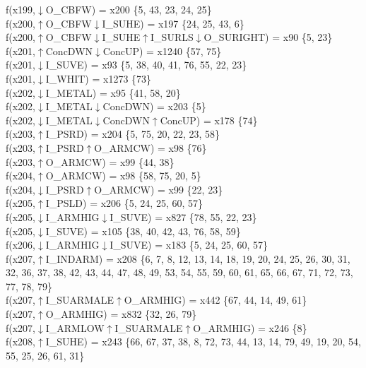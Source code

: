 f(x199,$\downarrow$O\_CBFW) = x200 \{5, 43, 23, 24, 25\} \\  
f(x200,$\uparrow$O\_CBFW$\downarrow$I\_SUHE) = x197 \{24, 25, 43, 6\} \\  
f(x200,$\uparrow$O\_CBFW$\downarrow$I\_SUHE$\uparrow$I\_SURLS$\downarrow$O\_SURIGHT) = x90 \{5, 23\} \\  
f(x201,$\uparrow$ConcDWN$\downarrow$ConcUP) = x1240 \{57, 75\} \\  
f(x201,$\downarrow$I\_SUVE) = x93 \{5, 38, 40, 41, 76, 55, 22, 23\} \\  
f(x201,$\downarrow$I\_WHIT) = x1273 \{73\} \\  
f(x202,$\downarrow$I\_METAL) = x95 \{41, 58, 20\} \\  
f(x202,$\downarrow$I\_METAL$\downarrow$ConcDWN) = x203 \{5\} \\  
f(x202,$\downarrow$I\_METAL$\downarrow$ConcDWN$\uparrow$ConcUP) = x178 \{74\} \\  
f(x203,$\uparrow$I\_PSRD) = x204 \{5, 75, 20, 22, 23, 58\} \\  
f(x203,$\uparrow$I\_PSRD$\uparrow$O\_ARMCW) = x98 \{76\} \\  
f(x203,$\uparrow$O\_ARMCW) = x99 \{44, 38\} \\  
f(x204,$\uparrow$O\_ARMCW) = x98 \{58, 75, 20, 5\} \\  
f(x204,$\downarrow$I\_PSRD$\uparrow$O\_ARMCW) = x99 \{22, 23\} \\  
f(x205,$\uparrow$I\_PSLD) = x206 \{5, 24, 25, 60, 57\} \\  
f(x205,$\downarrow$I\_ARMHIG$\downarrow$I\_SUVE) = x827 \{78, 55, 22, 23\} \\  
f(x205,$\downarrow$I\_SUVE) = x105 \{38, 40, 42, 43, 76, 58, 59\} \\  
f(x206,$\downarrow$I\_ARMHIG$\downarrow$I\_SUVE) = x183 \{5, 24, 25, 60, 57\} \\  
f(x207,$\uparrow$I\_INDARM) = x208 \{6, 7, 8, 12, 13, 14, 18, 19, 20, 24, 25, 26, 30, 31, 32, 36, 37, 38, 42, 43, 44, 47, 48, 49, 53, 54, 55, 59, 60, 61, 65, 66, 67, 71, 72, 73, 77, 78, 79\} \\  
f(x207,$\uparrow$I\_SUARMALE$\uparrow$O\_ARMHIG) = x442 \{67, 44, 14, 49, 61\} \\  
f(x207,$\uparrow$O\_ARMHIG) = x832 \{32, 26, 79\} \\  
f(x207,$\downarrow$I\_ARMLOW$\uparrow$I\_SUARMALE$\uparrow$O\_ARMHIG) = x246 \{8\} \\  
f(x208,$\uparrow$I\_SUHE) = x243 \{66, 67, 37, 38, 8, 72, 73, 44, 13, 14, 79, 49, 19, 20, 54, 55, 25, 26, 61, 31\} \\  
